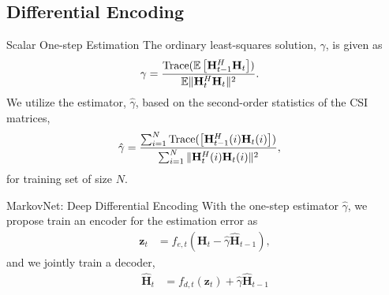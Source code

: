 \documentclass{beamer}
\begin{document}
  \subsection{Differential Encoding}

  \begin{frame}{Scalar One-step Estimation}
    The ordinary least-squares solution, $\gamma$, is given as
    \begin{align*}
      \gamma &= \frac{\text{Trace}(\mathbb E\left[\mathbf H_{t-1}^H\mathbf H_{t}\right])}{\mathbb E\Arrowvert\mathbf H_t^H \mathbf H_t\Arrowvert^2}.
    \end{align*}
    \pause
    We utilize the estimator, $\hat \gamma$, based on the second-order statistics of the CSI matrices,
    \begin{align*}
      \hat \gamma &= \frac{\sum_{i=1}^N\text{Trace}(\left[\mathbf H_{t-1}^H(i)\mathbf H_{t}(i)\right])}{\sum_{i=1}^N\Arrowvert\mathbf H_t^H(i) \mathbf H_t(i)\Arrowvert^2},
    \end{align*}
    for training set of size $N$.
  \end{frame}

  \begin{frame}{MarkovNet: Deep Differential Encoding}
    With the one-step estimator $\hat\gamma$, we propose train an encoder for the estimation error as
    \begin{align*}
      \mathbf z_t &= f_{e,t} (\mathbf H_t - \hat \gamma \hat {\mathbf H}_{t-1}),
    \end{align*}
    and we jointly train a decoder,
    \begin{align*}
      \hat{\mathbf H}_t &= f_{d,t}(\mathbf z_t) + \hat\gamma\hat{\mathbf H}_{t-1}
    \end{align*}
  \end{frame}
\end{document}
